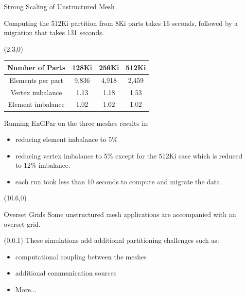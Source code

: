 \documentclass{beamer}
\begin{document}
\begin{textblock}{15.6}
\begin{textblock}{5}
\begin{block}{\centering Strong Scaling of Unstructured Mesh}
\begin{textblock}{2.3}
        Computing the 512Ki partition from 8Ki parts takes 16 seconds, followed by a migration that takes 131 seconds.
        
      \end{textblock}
      \begin{textblock}{2.5}(2.3,0)
      \begin{table}[!h]
        \centering
        \begin{tabular}{||c|c|c|c||}
          \hline
          Number of Parts &128Ki&256Ki&512Ki \\
          \hline
          Elements per part & 9,836 & 4,918&2,459  \\
          \hline
          Vertex imbalance & 1.13 & 1.18 & 1.53 \\
          \hline
          Element imbalance & 1.02& 1.02& 1.02\\
          \hline
        \end{tabular}
      \end{table}
      \end{textblock}
      \vspace{10cm}

      Running EnGPar on the three meshes results in:
      \begin{itemize}
      \item reducing element imbalance to 5\%
      \item reducing vertex imbalance to 5\% except for the 512Ki case which is reduced to 12\% imbalance.
      \item each run took less than 10 seconds to compute and migrate the data.
      \end{itemize}
      
      
    \end{block}
  \end{textblock}
  \begin{textblock}{5}(10.6,0)
    \begin{block}{\centering Overset Grids}
      Some unstructured mesh applications are accompanied with an overset grid.
      \begin{textblock}{2.7}(0,0.1)
        These simulations add additional partitioning challenges such as:
        \begin{itemize}
        \item computational coupling between the meshes
        \item additional communication sources
        \item More...
        \end{itemize}


\end{textblock}
\end{block}
\end{textblock}
\end{textblock}
\end{document}
